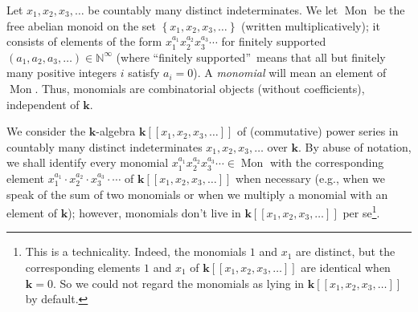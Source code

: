 \documentclass[numbers=enddot,12pt,final,onecolumn,notitlepage,abstracton]{scrartcl}%
\theoremstyle{definition}
\begin{document}
Let $x_{1},x_{2},x_{3},\ldots$ be countably many distinct indeterminates. We
let $\operatorname*{Mon}$ be the free abelian monoid on the set $\left\{
x_{1},x_{2},x_{3},\ldots\right\}  $ (written multiplicatively); it consists of
elements of the form $x_{1}^{a_{1}}x_{2}^{a_{2}}x_{3}^{a_{3}}\cdots$ for
finitely supported $\left(  a_{1},a_{2},a_{3},\ldots\right)  \in
\mathbb{N}^{\infty}$ (where \textquotedblleft finitely
supported\textquotedblright\ means that all but finitely many positive
integers $i$ satisfy $a_{i}=0$). A \textit{monomial} will mean an element of
$\operatorname*{Mon}$. Thus, monomials are combinatorial objects (without
coefficients), independent of $\mathbf{k}$.

We consider the $\mathbf{k}$-algebra $\mathbf{k}\left[  \left[  x_{1}%
,x_{2},x_{3},\ldots\right]  \right]  $ of (commutative) power series in
countably many distinct indeterminates $x_{1},x_{2},x_{3},\ldots$ over
$\mathbf{k}$. By abuse of notation, we shall identify every monomial
$x_{1}^{a_{1}}x_{2}^{a_{2}}x_{3}^{a_{3}}\cdots\in\operatorname*{Mon}$ with the
corresponding element $x_{1}^{a_{1}}\cdot x_{2}^{a_{2}}\cdot x_{3}^{a_{3}%
}\cdot\cdots$ of $\mathbf{k}\left[  \left[  x_{1},x_{2},x_{3},\ldots\right]
\right]  $ when necessary (e.g., when we speak of the sum of two monomials or
when we multiply a monomial with an element of $\mathbf{k}$); however,
monomials don't live in $\mathbf{k}\left[  \left[  x_{1},x_{2},x_{3}%
,\ldots\right]  \right]  $ per se\footnote{This is a technicality. Indeed, the
monomials $1$ and $x_{1}$ are distinct, but the corresponding elements $1$ and
$x_{1}$ of $\mathbf{k}\left[  \left[  x_{1},x_{2},x_{3},\ldots\right]
\right]  $ are identical when $\mathbf{k}=0$. So we could not regard the
monomials as lying in $\mathbf{k}\left[  \left[  x_{1},x_{2},x_{3}%
,\ldots\right]  \right]  $ by default.}.
\end{document}
